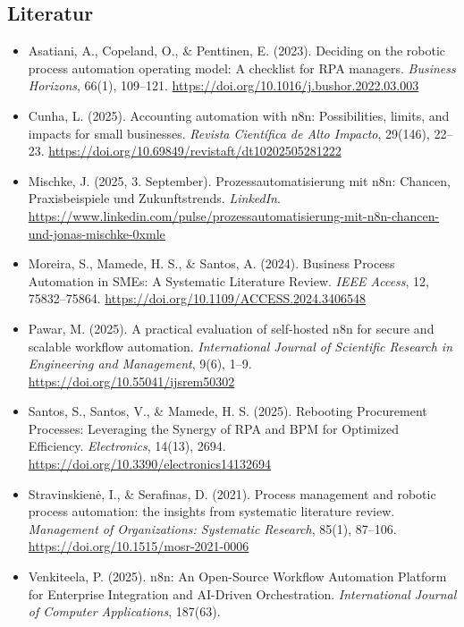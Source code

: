 ﻿\documentclass[a4paper,11pt]{article}
\begin{document}
\subsection*{Literatur} 
\begin{itemize} 
    \item Asatiani, A., Copeland, O., \& Penttinen, E. (2023). Deciding on the robotic process automation operating model: A checklist for RPA managers. \textit{Business Horizons}, 66(1), 109–121. \url{https://doi.org/10.1016/j.bushor.2022.03.003} 
    \item Cunha, L. (2025). Accounting automation with n8n: Possibilities, limits, and impacts for small businesses. \textit{Revista Científica de Alto Impacto}, 29(146), 22–23. \url{https://doi.org/10.69849/revistaft/dt10202505281222} 
    \item Mischke, J. (2025, 3. September). Prozessautomatisierung mit n8n: Chancen, Praxisbeispiele und Zukunftstrends. \textit{LinkedIn}. \url{https://www.linkedin.com/pulse/prozessautomatisierung-mit-n8n-chancen-und-jonas-mischke-0xmle} 
    \item Moreira, S., Mamede, H. S., \& Santos, A. (2024). Business Process Automation in SMEs: A Systematic Literature Review. \textit{IEEE Access}, 12, 75832–75864. \url{https://doi.org/10.1109/ACCESS.2024.3406548} 
    \item Pawar, M. (2025). A practical evaluation of self-hosted n8n for secure and scalable workflow automation. \textit{International Journal of Scientific Research in Engineering and Management}, 9(6), 1–9. \url{https://doi.org/10.55041/ijsrem50302} 
    \item Santos, S., Santos, V., \& Mamede, H. S. (2025). Rebooting Procurement Processes: Leveraging the Synergy of RPA and BPM for Optimized Efficiency. \textit{Electronics}, 14(13), 2694. \url{https://doi.org/10.3390/electronics14132694} 
    \item Stravinskienė, I., \& Serafinas, D. (2021). Process management and robotic process automation: the insights from systematic literature review. \textit{Management of Organizations: Systematic Research}, 85(1), 87–106. \url{https://doi.org/10.1515/mosr-2021-0006} 
    \item Venkiteela, P. (2025). n8n: An Open-Source Workflow Automation Platform for Enterprise Integration and AI-Driven Orchestration. \textit{International Journal of Computer Applications}, 187(63). 
\end{itemize}
\end{document}
